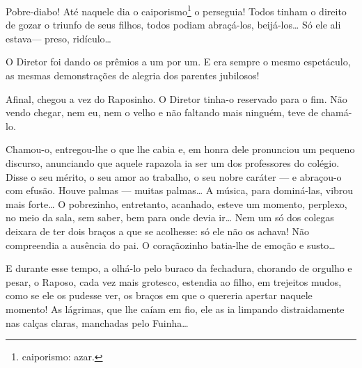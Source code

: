 Pobre-diabo! Até naquele dia o caiporismo\footnote{caiporismo: azar.} o
perseguia! Todos tinham o direito de gozar o triunfo de seus filhos,
todos podiam abraçá-los, beijá-los\ldots{} Só ele ali estava--- preso,
ridículo\ldots{}

O Diretor foi dando os prêmios a um por um. E era sempre o mesmo
espetáculo, as mesmas demonstrações de alegria dos parentes jubilosos!

Afinal, chegou a vez do Raposinho. O Diretor tinha-o reservado para o
fim. Não vendo chegar, nem eu, nem o velho e não faltando mais ninguém,
teve de chamá-lo.

Chamou-o, entregou-lhe o que lhe cabia e, em honra dele pronunciou um
pequeno discurso, anunciando que aquele rapazola ia ser um dos
professores do colégio. Disse o seu mérito, o seu amor ao trabalho, o
seu nobre caráter --- e abraçou-o com efusão. Houve palmas --- muitas
palmas\ldots{} A música, para dominá-las, vibrou mais forte\ldots{} O pobrezinho,
entretanto, acanhado, esteve um momento, perplexo, no meio da sala, sem
saber, bem para onde devia ir\ldots{} Nem um só dos colegas deixara de ter
dois braços a que se acolhesse: só ele não os achava! Não compreendia a
ausência do pai. O coraçãozinho batia-lhe de emoção e susto\ldots{}

E durante esse tempo, a olhá-lo pelo buraco da fechadura, chorando de
orgulho e pesar, o Raposo, cada vez mais grotesco, estendia ao filho, em
trejeitos mudos, como se ele os pudesse ver, os braços em que o quereria
apertar naquele momento! As lágrimas, que lhe caíam em fio, ele as ia
limpando distraidamente nas calças claras, manchadas pelo Fuinha\ldots{}

